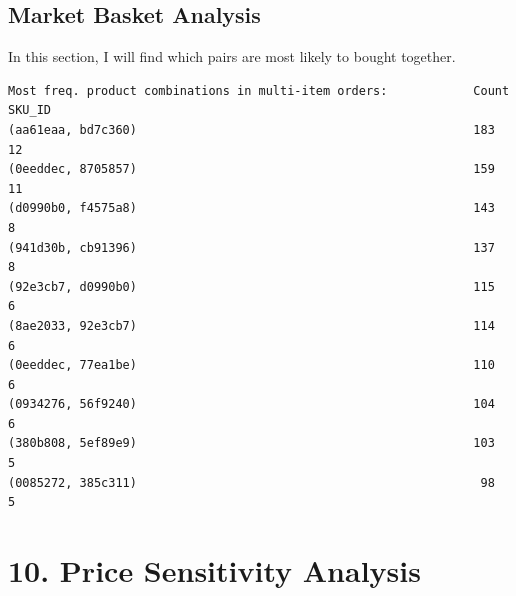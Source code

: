\documentclass{article}
\begin{document}
    \subsection{Market Basket Analysis}
    In this section, I will find which pairs are most likely to bought together.
    \begin{verbatim}
Most freq. product combinations in multi-item orders:            Count  SKU_ID 
(aa61eaa, bd7c360)                                               183    12
(0eeddec, 8705857)                                               159    11
(d0990b0, f4575a8)                                               143     8
(941d30b, cb91396)                                               137     8
(92e3cb7, d0990b0)                                               115     6
(8ae2033, 92e3cb7)                                               114     6
(0eeddec, 77ea1be)                                               110     6
(0934276, 56f9240)                                               104     6
(380b808, 5ef89e9)                                               103     5
(0085272, 385c311)                                                98     5

    \end{verbatim}

\section{10. Price Sensitivity Analysis}
\end{document}
